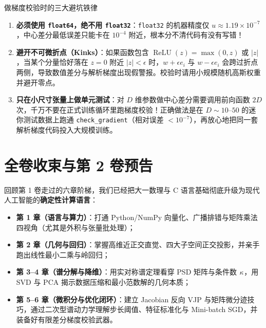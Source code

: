 \begin{failBox}{做梯度校验时的三大避坑铁律}
\begin{enumerate}
  \item \textbf{必须使用 \texttt{float64}，绝不用 \texttt{float32}}：\texttt{float32} 的机器精度仅 $u\approx 1.19\times 10^{-7}$，中心差分最低误差只能卡在 $10^{-4}$ 附近，根本分不清代码有没有写错！
  \item \textbf{避开不可微折点（Kinks）}：如果函数包含 $\operatorname{ReLU}(z)=\max(0,z)$ 或 $|z|$，当某个分量恰好落在 $z=0$ 附近 $|z|<\epsilon$ 时，$w+\epsilon e_i$ 与 $w-\epsilon e_i$ 会跨过折点两侧，导致数值差分与解析梯度出现假警报。校验时请用小规模随机高斯权重并避开零点。
  \item \textbf{只在小尺寸张量上做单元测试}：对 $D$ 维参数做中心差分需要调用前向函数 $2D$ 次，千万不要在正式训练循环里跑梯度校验！正确做法是在 $D\sim 10$--$50$ 的迷你测试数据上跑通 \texttt{check\_gradient}（相对误差 $<10^{-7}$），再放心地把同一套解析梯度代码投入大规模训练。
\end{enumerate}
\end{failBox}

\section{全卷收束与第 2 卷预告}
\label{sec:ch6-wrapup}

回顾第 1 卷走过的六章阶梯，我们已经把大一数理与 C 语言基础彻底升级为现代人工智能的\textbf{确定性计算语言}：
\begin{itemize}
  \item \textbf{第 1 章（语言与算力）}：打通 Python/NumPy 向量化、广播排错与矩阵乘法四视角（尤其是外积与张量批处理）；
  \item \textbf{第 2 章（几何与回归）}：掌握高维近正交直觉、四大子空间正交投影，并亲手跑出线性最小二乘与岭回归；
  \item \textbf{第 3--4 章（谱分解与降维）}：用实对称谱定理看穿 PSD 矩阵与条件数 $\kappa$，用 SVD 与 PCA 揭示数据压缩和最小范数解的几何本质；
  \item \textbf{第 5--6 章（微积分与优化闭环）}：建立 Jacobian 反向 VJP 与矩阵微分迹技巧，通过二次型谱动力学理解步长阈值、特征标准化与 Mini-batch SGD，并装备好有限差分梯度校验武器。
\end{itemize}

